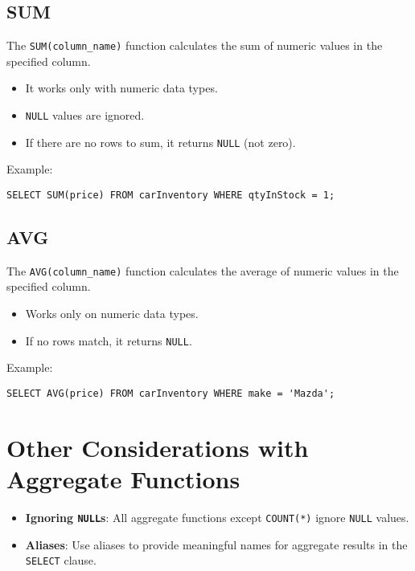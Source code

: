 \documentclass{article}
\begin{document}
\subsection{SUM}
The \texttt{SUM(column\_name)} function calculates the sum of numeric values in the specified column.
\begin{itemize}
    \item It works only with numeric data types.
    \item \texttt{NULL} values are ignored.
    \item If there are no rows to sum, it returns \texttt{NULL} (not zero).
\end{itemize}
Example:
\begin{verbatim}
SELECT SUM(price) FROM carInventory WHERE qtyInStock = 1;
\end{verbatim}

\subsection{AVG}
The \texttt{AVG(column\_name)} function calculates the average of numeric values in the specified column.
\begin{itemize}
    \item Works only on numeric data types.
    \item If no rows match, it returns \texttt{NULL}.
\end{itemize}
Example:
\begin{verbatim}
SELECT AVG(price) FROM carInventory WHERE make = 'Mazda';
\end{verbatim}

\section{Other Considerations with Aggregate Functions}
\begin{itemize}
    \item \textbf{Ignoring \texttt{NULL}s}: All aggregate functions except \texttt{COUNT(*)} ignore \texttt{NULL} values.
    \item \textbf{Aliases}: Use aliases to provide meaningful names for aggregate results in the \texttt{SELECT} clause.
\end{itemize}
\end{document}
